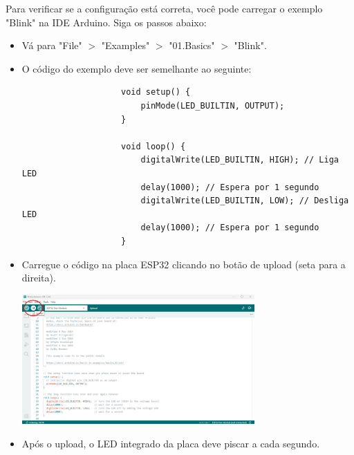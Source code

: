 \documentclass[a4paper]{article}
\begin{document}
\begin{answer}
\begin{enumerate}
                Para verificar se a configuração está correta, você pode carregar o
                exemplo "Blink" na IDE Arduino. Siga os passos abaixo:

                \begin{itemize}
                    \item  Vá para "File" $>$ "Examples" $>$ "01.Basics" $>$ "Blink".
                    \item  O código do exemplo deve ser semelhante ao seguinte:

                    \begin{verbatim}
                    void setup() {
                        pinMode(LED_BUILTIN, OUTPUT);
                    }

                    void loop() {
                        digitalWrite(LED_BUILTIN, HIGH); // Liga LED
                        delay(1000); // Espera por 1 segundo
                        digitalWrite(LED_BUILTIN, LOW); // Desliga LED
                        delay(1000); // Espera por 1 segundo
                    }
                    \end{verbatim}

                    \item  Carregue o código na placa ESP32 clicando no botão de upload (seta para a direita).
                    \begin{center}
                        \includegraphics[width=0.7\textwidth]{images/upload.png}
                    \end{center}
                    \item  Após o upload, o LED integrado da placa deve piscar a cada segundo.
                \end{itemize}
        \end{enumerate}
    \end{answer}
\end{document}
